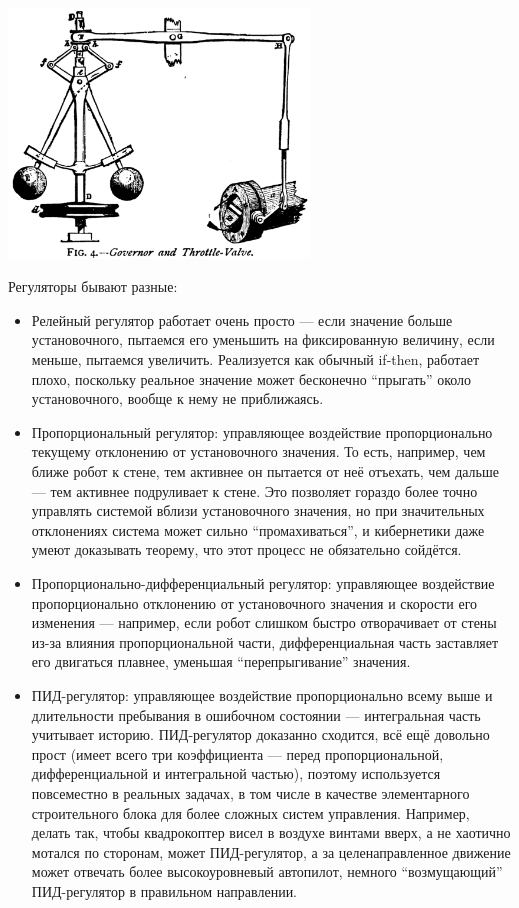 \documentclass{../../text-style}
\begin{document}
\begin{center}
    \includegraphics[width=0.6\textwidth]{wattRegulator.png}
\end{center}

Регуляторы бывают разные:

\begin{itemize}
    \item Релейный регулятор работает очень просто --- если значение больше установочного, пытаемся его уменьшить на фиксированную величину, если меньше, пытаемся увеличить.
        Реализуется как обычный if-then, работает плохо, поскольку реальное значение может бесконечно \enquote{прыгать} около установочного, вообще к нему не приближаясь.
    \item Пропорциональный регулятор: управляющее воздействие пропорционально текущему отклонению от установочного значения.
        То есть, например, чем ближе робот к стене, тем активнее он пытается от неё отъехать, чем дальше --- тем активнее подруливает к стене.
        Это позволяет гораздо более точно управлять системой вблизи установочного значения, но при значительных отклонениях система может сильно \enquote{промахиваться}, и кибернетики даже умеют доказывать теорему, что этот процесс не обязательно сойдётся.
    \item Пропорционально-дифференциальный регулятор: управляющее воздействие пропорционально отклонению от установочного значения и скорости его изменения --- например, если робот слишком быстро отворачивает от стены из-за влияния пропорциональной части, дифференциальная часть заставляет его двигаться плавнее, уменьшая \enquote{перепрыгивание} значения.
    \item ПИД-регулятор: управляющее воздействие пропорционально всему выше и длительности пребывания в ошибочном состоянии --- интегральная часть учитывает историю.
        ПИД-регулятор доказанно сходится, всё ещё довольно прост (имеет всего три коэффициента --- перед пропорциональной, дифференциальной и интегральной частью), поэтому используется повсеместно в реальных задачах, в том числе в качестве элементарного строительного блока для более сложных систем управления.
        Например, делать так, чтобы квадрокоптер висел в воздухе винтами вверх, а не хаотично мотался по сторонам, может ПИД-регулятор, а за целенаправленное движение может отвечать более высокоуровневый автопилот, немного \enquote{возмущающий} ПИД-регулятор в правильном направлении.
\end{itemize}
\end{document}
